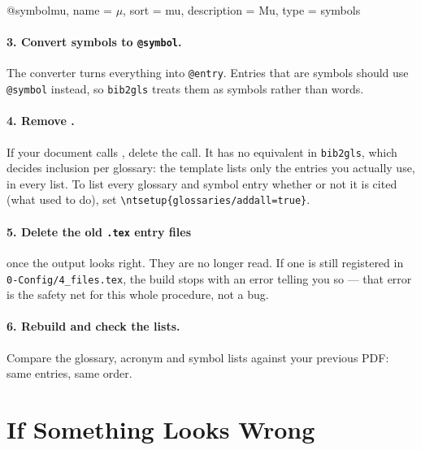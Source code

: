 \begin{latexcode}
@symbol{mu,
  name        = {\ensuremath{\mu}},
  sort        = {mu},        %
  description = {Mu},
  type        = {symbols}
}
\end{latexcode}

\paragraph{3. Convert symbols to \texttt{@symbol}.}  The converter turns
everything into \texttt{@entry}.  Entries that are symbols should use
\texttt{@symbol} instead, so \texttt{bib2gls} treats them as symbols rather
than words.

\paragraph{4. Remove \latexinline{\glsaddall}.}  If your document calls
\latexinline{\glsaddall}, delete the call.  It has no equivalent in
\texttt{bib2gls}, which decides inclusion per glossary: the template lists
only the entries you actually use, in every list.  To list every glossary
and symbol entry whether or not it is cited (what \latexinline{\glsaddall}
used to do), set \verb!\ntsetup{glossaries/addall=true}!.

\paragraph{5. Delete the old \texttt{.tex} entry files} once the output looks
right.  They are no longer read.  If one is still registered in
\verb!0-Config/4_files.tex!, the build stops with an error telling you so ---
that error is the safety net for this whole procedure, not a bug.

\paragraph{6. Rebuild and check the lists.}  Compare the glossary, acronym
and symbol lists against your previous \gls{PDF}: same entries, same order.

\section{If Something Looks Wrong}

